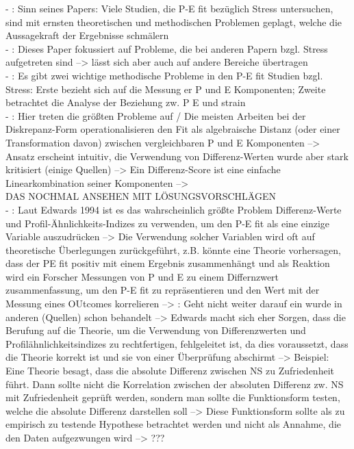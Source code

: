 - \cite[S. 2]{edwards:1990}: Sinn seines Papers: Viele Studien, die P-E fit bezüglich Stress untersuchen, sind mit ernsten theoretischen und methodischen Problemen geplagt, welche die Aussagekraft der Ergebnisse schmälern \\
- \cite[S. 3]{edwards:1990}: Dieses Paper fokussiert auf Probleme, die bei anderen Papern bzgl. Stress aufgetreten sind --> lässt sich aber auch auf andere Bereiche übertragen \\
- \cite[S. 7]{edwards:1990}: Es gibt zwei wichtige methodische Probleme in den P-E fit Studien bzgl. Stress: Erste bezieht sich auf die Messung er P und E Komponenten; Zweite betrachtet die Analyse der Beziehung zw. P E und strain \\
- \cite[S. 9]{edwards:1990}: Hier treten die größten Probleme auf / Die meisten Arbeiten bei der Diskrepanz-Form operationalisieren den Fit als algebraische Distanz (oder einer Transformation davon) zwischen vergleichbaren P und E Komponenten --> Ansatz erscheint intuitiv, die Verwendung von Differenz-Werten wurde aber stark kritisiert (einige Quellen) --> Ein Differenz-Score ist eine einfache Linearkombination seiner Komponenten --> \\
DAS NOCHMAL ANSEHEN MIT LÖSUNGSVORSCHLÄGEN \\
- \cite[S. 55]{edwards:2008}: Laut Edwards 1994 ist es das wahrscheinlich größte Problem Differenz-Werte und Profil-Ähnlichkeits-Indizes zu verwenden, um den P-E fit als eine einzige Variable auszudrücken --> Die Verwendung solcher Variablen wird oft auf theoretische Überlegungen zurückgeführt, z.B. könnte eine Theorie vorhersagen, dass der PE fit positiv mit einem Ergebnis zusammenhängt und als Reaktion wird ein Forscher Messungen von P und E zu einem Differnzwert zusammenfassung, um den P-E fit zu repräsentieren und den Wert mit der Messung eines OUtcomes korrelieren --> \cite[S. 56]{edwards:2008}: Geht nicht weiter darauf ein wurde in anderen (Quellen) schon behandelt --> Edwards macht sich eher Sorgen, dass die Berufung auf die Theorie, um die Verwendung von Differenzwerten und Profilähnlichkeitsindizes zu rechtfertigen, fehlgeleitet ist, da dies voraussetzt, dass die Theorie korrekt ist und sie von einer Überprüfung abschirmt --> Beispiel: Eine Theorie besagt, dass die absolute Differenz zwischen NS zu Zufriedenheit führt. Dann sollte nicht die Korrelation zwischen der absoluten Differenz zw. NS mit Zufriedenheit geprüft werden, sondern man sollte die Funktionsform testen, welche die absolute Differenz darstellen soll --> Diese Funktionsform sollte als zu empirisch zu testende Hypothese betrachtet werden und nicht als Annahme, die den Daten aufgezwungen wird --> ??? \\
